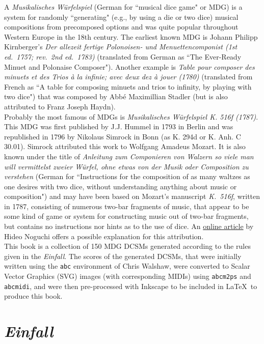 \documentclass[a4paper,x11names,svgnames,10pt]{article}
\begin{document}
{A {\it Musikalisches W\"{u}rfelspiel} (German for ``musical dice game" or MDG) is a system for randomly ``generating" (e.g., by using a die or two dice) musical compositions from precomposed options and was quite popular throughout Western Europe in the 18th century.  The earliest known MDG is Johann Philipp Kirnberger's {\em Der allezeit fertige Polonoisen- und Menuettencomponist (1st ed.\ 1757; rev.\ 2nd ed.\ 1783)} (translated from German as ``The Ever-Ready Minuet and Polonaise Composer"). Another example is {\em Table pour composer des minuets et des Trios \`{a} la infinie; avec deux dez \`{a} jouer (1780)} (translated from French as ``A table for composing minuets and trios to infinity, by playing with two dice") that was composed by Abb\'{e} Maximillian Stadler (but is also attributed to Franz Joseph Haydn). \\

Probably the most famous of MDGs is {\it Musikalisches W\"{u}rfelspiel K. 516f (1787)}.  This MDG was first published by J.J. Hummel in 1793 in Berlin and was republished in 1796 by Nikolaus Simrock in Bonn (as K. 294d or K. Anh. C 30.01). Simrock attributed this work to Wolfgang Amadeus Mozart. It is also known under the title of {\em Anleitung zum Componieren von Walzern so viele man will vermittelst zweier W\"{u}rfel, ohne etwas von der Musik oder Composition zu verstehen} (German for ``Instructions for the composition of as many waltzes as one desires with two dice, without understanding anything about music or composition") and may have been based on Mozart's manuscript {\em K.\ 516f}, written in 1787, consisting of numerous two-bar fragments of music, that appear to be some kind of game or system for constructing music out of two-bar fragments, but contains no instructions nor hints as to the use of dice.  An \href{(http://www.asahi-net.or.jp/\~rb5h-ngc/e/k516f.htm}{online article} by Hideo Noguchi offers a possible explanation for this attribution. \\

This book is a collection of 150 MDG DCSMs generated according to the rules given in the {\it Einfall}. The scores of the generated DCSMs, that were initially written using the \texttt{abc} environment of Chris Walshaw, were converted to Scalar Vector Graphics (SVG) images (with corresponding MIDIs) using {\tt abcm2ps} and {\tt abcmidi}, and were then pre-processed with Inkscape to be included in \LaTeX\ to produce this book.


\section{\em Einfall}

}
\end{document}

